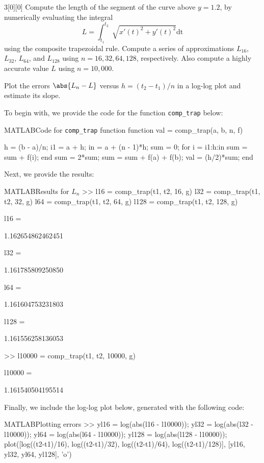 \documentclass{article}
\begin{document}
\begin{hw}{3}[0][0]
Compute the length of the segment of the curve above $y = 1.2$, by numerically evaluating the
integral
\begin{equation*}
	L = \int_{t_1}^{t_2} \sqrt[]{x'(t)^{2} + y'(t)^{2}} \mathrm{dt}
\end{equation*}
using the composite trapezoidal rule. Compute a series of approximations $L_{16}$, $L_{32}$, $L_{64}$, and $L_{128}$ using $n = 16, 32, 64, 128$, respectively. Also compute a highly accurate value $L$ using $n = 10, 000$.

Plot the errors $\abs{L_n - L}$ versus $h = (t_2 - t_1)/n$ in a log-log plot and estimate its slope.
\end{hw}

\begin{solution}
To begin with, we provide the code for the function \texttt{comp\_trap} below:
\begin{code}{MATLAB}{Code for \texttt{comp\_trap} function}
function val = comp_trap(a, b, n, f)

h = (b - a)/n;
i1 = a + h;
in = a + (n - 1)*h;
sum = 0;
for i = i1:h:in
sum = sum + f(i);
end
sum = 2*sum;
sum = sum + f(a) + f(b);
val = (h/2)*sum;
end
\end{code}

Next, we provide the results:
\begin{code}{MATLAB}{Results for $L_n$}
>> l16 = comp_trap(t1, t2, 16, g)
l32 = comp_trap(t1, t2, 32, g)
l64 = comp_trap(t1, t2, 64, g)
l128 = comp_trap(t1, t2, 128, g)

l16 =

1.162654862462451


l32 =

1.161785809250850


l64 =

1.161604753231803


l128 =

1.161556258136053

>> l10000 = comp_trap(t1, t2, 10000, g)

l10000 =

1.161540504195514
\end{code}

Finally, we include the log-log plot below, generated with the following code:
\begin{code}{MATLAB}{Plotting errors}
>> yl16 = log(abs(l16 - l10000));
yl32 = log(abs(l32 - l10000));
yl64 = log(abs(l64 - l10000));
yl128 = log(abs(l128 - l10000));
plot([log((t2-t1)/16), log((t2-t1)/32), log((t2-t1)/64), log((t2-t1)/128)], [yl16, yl32, yl64, yl128], 'o')
\end{code}


\end{solution}
\end{document}
